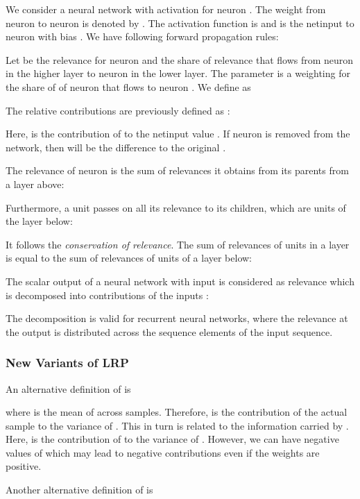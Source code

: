 \documentclass{article}
\begin{document}
\begin{appendices}
We consider a neural network with activation  for neuron .
The weight from neuron  to neuron  is denoted by .
The activation function is  and  is the netinput to
neuron  with bias .
We have following forward propagation rules:
 


Let  be the relevance for neuron  and 
the share of relevance  that flows from neuron  in the higher
layer to neuron  in the lower layer.
The parameter  is a weighting for the share of  of neuron
 that flows to neuron . We define  as

The relative contributions  are
previously defined as \cite{Bach:15,Montavon:17,Arras:17}:

Here,  is the contribution of  to the netinput value .
If neuron  is removed from the network,
then   will be the difference to the original .



The relevance  of neuron  is the sum of relevances it obtains
from its parents  from a layer above: 

Furthermore, a unit  passes on all its relevance  to its children,
which are units  of the layer below:

It follows the {\em conservation of relevance}.
The sum of relevances 
of units  in a layer is equal to the sum of
relevances  of units 
of a layer below:
 


The scalar output  
of a neural network with input 
is considered as relevance  which is
decomposed into contributions  of the inputs :
 

The decomposition is valid for recurrent neural networks,
where the relevance at the output
is distributed across the sequence elements of the
input sequence.


\subsubsection{New Variants of LRP}
\label{sec:ALRPvariants}


An alternative definition of  is
 
where  is the mean of  across samples.
Therefore,  is the contribution of the
actual sample to the variance of . This in turn is related to
the information carried by .
Here,  is the contribution of  to the variance of
. However, we can have negative values of
 which may lead to negative contributions even
if the weights are positive.

Another alternative definition of  is
 

\end{appendices}
\end{document}
